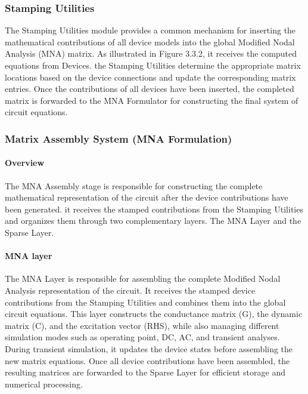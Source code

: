 \subsubsection{Stamping Utilities}
The Stamping Utilities module provides a common mechanism for inserting the mathematical contributions of all device models into the global Modified Nodal Analysis (MNA) matrix. As illustrated in Figure 3.3.2, it receives the computed equations from Devices. the Stamping Utilities determine the appropriate matrix locations based on the device connections and update the corresponding matrix entries. Once the contributions of all devices have been inserted, the completed matrix is forwarded to the MNA Formulator for constructing the final system of circuit equations.
\subsubsection{Matrix Assembly System (MNA Formulation)}
\paragraph{Overview}
The MNA Assembly stage is responsible for constructing the complete mathematical representation of the circuit after the device contributions have been generated. it receives the stamped contributions from the Stamping Utilities and organizes them through two complementary layers. The MNA Layer and the Sparse Layer.
\paragraph{MNA layer}
The MNA Layer is responsible for assembling the complete Modified Nodal Analysis representation of the circuit. It receives the stamped device contributions from the Stamping Utilities and combines them into the global circuit equations. This layer constructs the conductance matrix (G), the dynamic matrix (C), and the excitation vector (RHS), while also managing different simulation modes such as operating point, DC, AC, and transient analyses. During transient simulation, it updates the device states before assembling the new matrix equations. Once all device contributions have been assembled, the resulting matrices are forwarded to the Sparse Layer for efficient storage and numerical processing.
